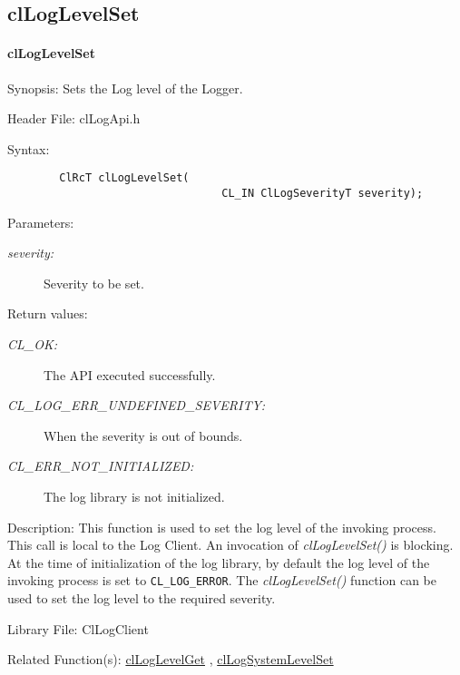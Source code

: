 \subsection{clLogLevelSet}
\hypertarget{pagelog103}{}\paragraph{cl\-Log\-Level\-Set}\label{pagelog103}
\begin{Desc}
\item[Synopsis:]Sets the Log level of the Logger.\end{Desc}
\begin{Desc}
\item[Header File:]clLogApi.h\end{Desc}
\begin{Desc}
\item[Syntax:]

\footnotesize\begin{verbatim}        ClRcT clLogLevelSet(
                                 CL_IN ClLogSeverityT severity);
\end{verbatim}
\normalsize
\end{Desc}
\begin{Desc}
\item[Parameters:]
\begin{description}
\item[{\em severity:}]Severity to be set.\end{description}
\end{Desc}
\begin{Desc}
\item[Return values:]
\begin{description}
\item[{\em CL\_\-OK:}]The API executed successfully. \item[{\em CL\_\-LOG\_\-ERR\_\-UNDEFINED\_\-SEVERITY:}]When the severity is out of bounds. \item[{\em CL\_\-ERR\_\-NOT\_\-INITIALIZED:}]The log library is not initialized.\end{description}
\end{Desc}
\begin{Desc}
\item[Description:]This function is used to set the log level of the invoking process. This call is local to the Log Client. An invocation of 
\textit{clLogLevelSet()} is blocking. At the time of initialization of the log library, by default the log level of the 
invoking process is set to {\tt CL\_\-LOG\_\-ERROR}. The \textit{clLogLevelSet()} function can be used to set the log level 
to the required severity.\end{Desc}
\begin{Desc}
\item[Library File:]Cl\-Log\-Client\end{Desc}
\begin{Desc}
\item[Related Function(s):]\hyperlink{pagelog104}{cl\-Log\-Level\-Get} , \hyperlink{pagelog108}{cl\-Log\-System\-Level\-Set} \end{Desc}
\newpage


